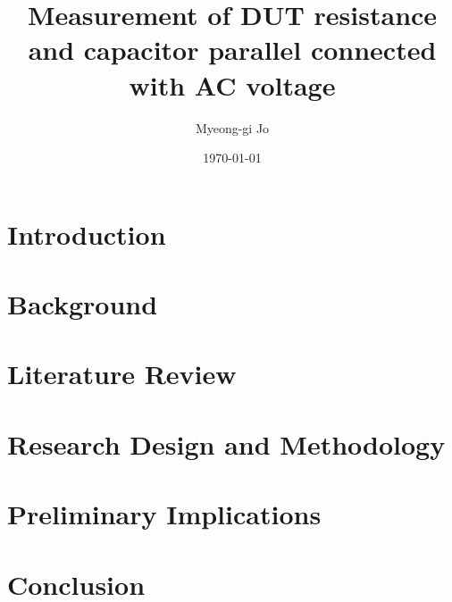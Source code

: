 \documentclass[12pt]{article}
\begin{document}
\title{Measurement of DUT resistance and capacitor parallel connected with AC voltage}
\author{Myeong-gi Jo}

\date{\today}
\maketitle

\section{Introduction}
\section{Background}
\section{Literature Review}
\section{Research Design and Methodology}
\section{Preliminary Implications}
\section{Conclusion}
\end{document}
